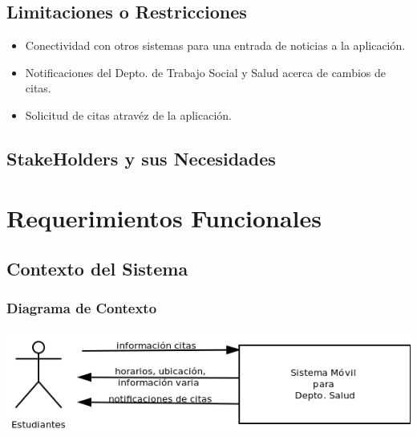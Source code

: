 \documentclass[12pt]{article}
\makeatletter
\newcommand{\specialcell}[2][c]{%
  \begin{tabular}[#1]{@{}c@{}}#2\end{tabular}}
\makeatother
\begin{document}
\subsection{Limitaciones o Restricciones}

\begin{itemize}
	\item{Conectividad con otros sistemas para una entrada de noticias a la aplicaci\'on.}
	\item{Notificaciones del Depto. de Trabajo Social y Salud acerca de cambios de citas.}
	\item{Solicitud de citas atrav\'ez de la aplicaci\'on.}
\end{itemize}

\subsection{StakeHolders y sus Necesidades}


\section{Requerimientos Funcionales}

\subsection{Contexto del Sistema}

\subsubsection{Diagrama de Contexto}

\includegraphics[width=\linewidth]{"../Documentos/Diagramas/diagrama contexto"}
\end{document}

